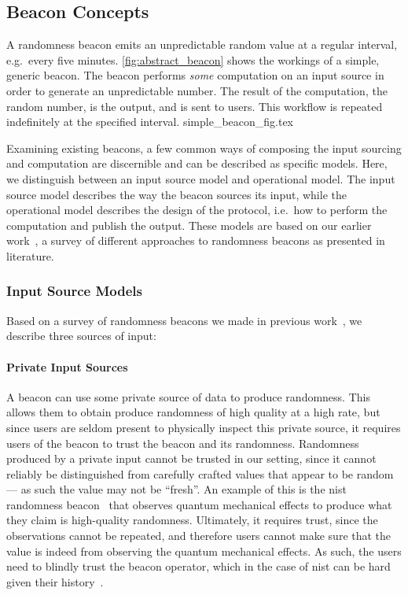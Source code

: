 \subsection{Beacon Concepts}

A randomness beacon emits an unpredictable random value at a regular interval, e.g.\ every five minutes.
\cref{fig:abstract_beacon} shows the workings of a simple, generic beacon.
The beacon performs \emph{some} computation on an input source in order to generate an unpredictable number.
The result of the computation, the random number, is the output, and is sent to users.
This workflow is repeated indefinitely at the specified interval.
{simple_beacon_fig.tex}

Examining existing beacons, a few common ways of composing the input sourcing and computation are discernible and can be described as specific models.
Here, we distinguish between an input source model and operational model.
The input source model describes the way the beacon sources its input, while the operational model describes the design of the protocol, i.e.\ how to perform the computation and publish the output.
These models are based on our earlier work~\cite{worldsbestpaper}, a survey of different approaches to randomness beacons as presented in literature.

\subsubsection{Input Source Models}
Based on a survey of randomness beacons we made in previous work~\cite{worldsbestpaper}, we describe three sources of input:

\paragraph{Private Input Sources}
A beacon can use some private source of data to produce randomness.
This allows them to obtain produce randomness of high quality at a high rate, but since users are seldom present to physically inspect this private source, it requires users of the beacon to trust the beacon and its randomness.
Randomness produced by a private input cannot be trusted in our setting, since it cannot reliably be distinguished from carefully crafted values that appear to be random --- as such the value may not be \enquote{fresh}.
An example of this is the \gls{nist} randomness beacon~\cite{nistbeacon} that observes quantum mechanical effects to produce what they claim is high-quality randomness.
Ultimately, it requires trust, since the observations cannot be repeated, and therefore users cannot make sure that the value is indeed from observing the quantum mechanical effects.
As such, the users need to blindly trust the beacon operator, which in the case of \gls{nist} can be hard given their history~\cite{nist2014backdoor, nytimes-nsaconstants, nytimes-nsabackdoors}.

